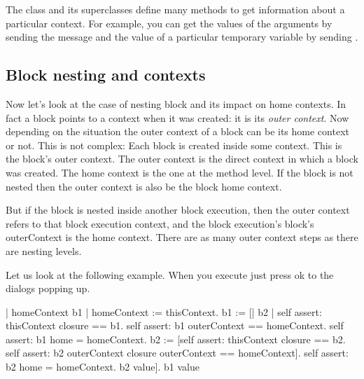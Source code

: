 \documentclass[a4paper,10pt,twoside]{book}
\begin{document}
The class  and its superclasses define many methods to get information about a particular context. For example, you can get the values of the arguments by sending the  message and the value of a particular temporary variable by sending .


\subsection{Block nesting and contexts}
Now let's look at the case of nesting block and its impact on home contexts.
In fact a block points to a context when it was created: it is its \emph{outer context}. Now depending on the situation the outer context of a block can be its home context or not. 
This is not complex: Each block is created inside some context.  This is the block's outer context. The outer context is the direct context in which a block was created. The home context is the one at the method level. 
If the block is not nested then the outer context is also be the block home context.

But if the block is nested inside another block execution, then the outer context refers to that block execution context, and the block execution's block's outerContext is the home context.  There are as many outer context steps as there are nesting levels.

Let us look at the following example. When you execute just press ok to the dialogs popping up.

\begin{code}{}
| homeContext b1 |
homeContext := thisContext.
b1 := [| b2 |
          self assert: thisContext closure == b1.
          self assert: b1 outerContext == homeContext.
	      self assert: b1 home = homeContext.
          b2 := [self assert: thisContext closure == b2.
                  self assert: b2 outerContext closure outerContext == homeContext].
		     	  self assert: b2 home = homeContext.
          b2 value].
b1 value 
\end{code}
\end{document}
